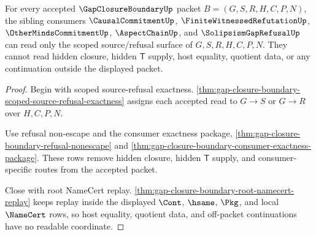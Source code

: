\begin{theorem}
\label{thm:gap-closure-boundary-scoped-consumer-nonescape}
For every accepted $\GapClosureBoundaryUp$ packet $B=(G,S,R,H,C,P,N)$, the sibling consumers $\CausalCommitmentUp$, $\FiniteWitnessedRefutationUp$, $\OtherMindsCommitmentUp$, $\AspectChainUp$, and $\SolipsismGapRefusalUp$ can read only the scoped source/refusal surface of $G,S,R,H,C,P,N$. They cannot read hidden closure, hidden $\mathsf{T}$ supply, host equality, quotient data, or any continuation outside the displayed packet.
\end{theorem}
\begin{proof}
Begin with scoped source-refusal exactness. \autoref{thm:gap-closure-boundary-scoped-source-refusal-exactness} assigns each accepted read to $G \longrightarrow S$ or $G \longrightarrow R$ over $H,C,P,N$.

Use refusal non-escape and the consumer exactness package, \autoref{thm:gap-closure-boundary-refusal-nonescape} and \autoref{thm:gap-closure-boundary-consumer-exactness-package}. These rows remove hidden closure, hidden $\mathsf{T}$ supply, and consumer-specific routes from the accepted packet.

Close with root NameCert replay. \autoref{thm:gap-closure-boundary-root-namecert-replay} keeps replay inside the displayed $\Cont$, $\hsame$, $\Pkg$, and local $\NameCert$ rows, so host equality, quotient data, and off-packet continuations have no readable coordinate.
\end{proof}
